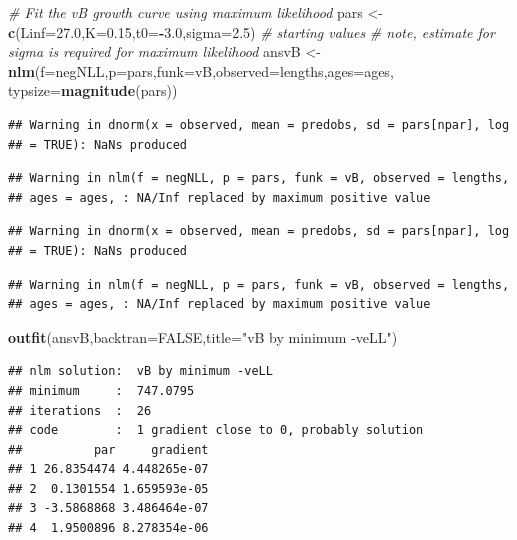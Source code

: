 \documentclass[
  lang=cn,
  11pt,
  scheme=chinese,
  chinesefont=nofont,
  citestyle=gb7714-2015,
  bibstyle=gb7714-2015]{elegantbook}
\newenvironment{Shaded}{\begin{snugshade}}{\end{snugshade}}
\newcommand{\AttributeTok}[1]{\textcolor[rgb]{0.13,0.29,0.53}{#1}}
\newcommand{\CommentTok}[1]{\textcolor[rgb]{0.56,0.35,0.01}{\textit{#1}}}
\newcommand{\ConstantTok}[1]{\textcolor[rgb]{0.56,0.35,0.01}{#1}}
\newcommand{\FloatTok}[1]{\textcolor[rgb]{0.00,0.00,0.81}{#1}}
\newcommand{\FunctionTok}[1]{\textcolor[rgb]{0.13,0.29,0.53}{\textbf{#1}}}
\newcommand{\NormalTok}[1]{#1}
\newcommand{\OtherTok}[1]{\textcolor[rgb]{0.56,0.35,0.01}{#1}}
\newcommand{\SpecialCharTok}[1]{\textcolor[rgb]{0.81,0.36,0.00}{\textbf{#1}}}
\newcommand{\StringTok}[1]{\textcolor[rgb]{0.31,0.60,0.02}{#1}}
\begin{document}
\begin{Shaded}
\begin{Highlighting}[]
 \CommentTok{\# Fit the vB growth curve using maximum likelihood  }
\NormalTok{pars }\OtherTok{\textless{}{-}} \FunctionTok{c}\NormalTok{(}\AttributeTok{Linf=}\FloatTok{27.0}\NormalTok{,}\AttributeTok{K=}\FloatTok{0.15}\NormalTok{,}\AttributeTok{t0=}\SpecialCharTok{{-}}\FloatTok{3.0}\NormalTok{,}\AttributeTok{sigma=}\FloatTok{2.5}\NormalTok{) }\CommentTok{\# starting values  }
 \CommentTok{\# note, estimate for sigma is required for maximum likelihood  }
\NormalTok{ansvB }\OtherTok{\textless{}{-}} \FunctionTok{nlm}\NormalTok{(}\AttributeTok{f=}\NormalTok{negNLL,}\AttributeTok{p=}\NormalTok{pars,}\AttributeTok{funk=}\NormalTok{vB,}\AttributeTok{observed=}\NormalTok{lengths,}\AttributeTok{ages=}\NormalTok{ages,  }
             \AttributeTok{typsize=}\FunctionTok{magnitude}\NormalTok{(pars))  }
\end{Highlighting}
\end{Shaded}

\begin{verbatim}
## Warning in dnorm(x = observed, mean = predobs, sd = pars[npar], log
## = TRUE): NaNs produced
\end{verbatim}

\begin{verbatim}
## Warning in nlm(f = negNLL, p = pars, funk = vB, observed = lengths,
## ages = ages, : NA/Inf replaced by maximum positive value
\end{verbatim}

\begin{verbatim}
## Warning in dnorm(x = observed, mean = predobs, sd = pars[npar], log
## = TRUE): NaNs produced
\end{verbatim}

\begin{verbatim}
## Warning in nlm(f = negNLL, p = pars, funk = vB, observed = lengths,
## ages = ages, : NA/Inf replaced by maximum positive value
\end{verbatim}

\begin{Shaded}
\begin{Highlighting}[]
\FunctionTok{outfit}\NormalTok{(ansvB,}\AttributeTok{backtran=}\ConstantTok{FALSE}\NormalTok{,}\AttributeTok{title=}\StringTok{"vB by minimum {-}veLL"}\NormalTok{)  }
\end{Highlighting}
\end{Shaded}

\begin{verbatim}
## nlm solution:  vB by minimum -veLL 
## minimum     :  747.0795 
## iterations  :  26 
## code        :  1 gradient close to 0, probably solution 
##          par     gradient
## 1 26.8354474 4.448265e-07
## 2  0.1301554 1.659593e-05
## 3 -3.5868868 3.486464e-07
## 4  1.9500896 8.278354e-06
\end{verbatim}
\end{document}
